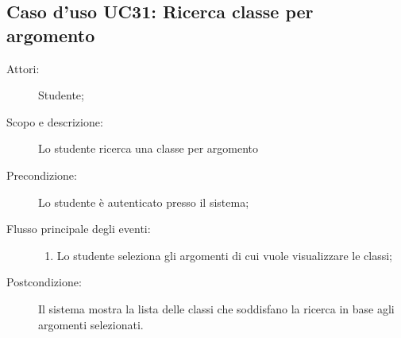\subsection{Caso d'uso UC31: Ricerca classe per argomento}\begin{description}
\item[Attori:] Studente;
\item[Scopo e descrizione:] Lo studente ricerca una classe per argomento
      \item[Precondizione:] Lo studente è autenticato presso il sistema;

        \item[Flusso principale degli eventi:] \begin{enumerate}
          \item Lo studente seleziona gli argomenti di cui vuole visualizzare le classi;

      \end{enumerate}
    \item[Postcondizione:] Il sistema mostra la lista delle classi che soddisfano la ricerca in base agli argomenti selezionati.
  \end{description}
\hypertarget{UC32}{}
